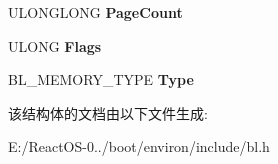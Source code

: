\begin{DoxyCompactItemize}
\begin{tabbing}
\end{tabbing}\item 
\mbox{\label{struct___b_l___m_e_m_o_r_y___d_e_s_c_r_i_p_t_o_r_a0fd589f9c948e7670af5405c12e04396}} 
U\+L\+O\+N\+G\+L\+O\+NG {\bfseries Page\+Count}
\item 
\mbox{\label{struct___b_l___m_e_m_o_r_y___d_e_s_c_r_i_p_t_o_r_acc384a10bc0d6f62ca8bc9ec4f81f429}} 
U\+L\+O\+NG {\bfseries Flags}
\item 
\mbox{\label{struct___b_l___m_e_m_o_r_y___d_e_s_c_r_i_p_t_o_r_a67ad93e786d74de9fd012caba41fa2bb}} 
B\+L\+\_\+\+M\+E\+M\+O\+R\+Y\+\_\+\+T\+Y\+PE {\bfseries Type}
\end{DoxyCompactItemize}


该结构体的文档由以下文件生成\+:\begin{DoxyCompactItemize}
\item 
E\+:/\+React\+O\+S-\/0../boot/environ/include/bl.\+h\end{DoxyCompactItemize}
